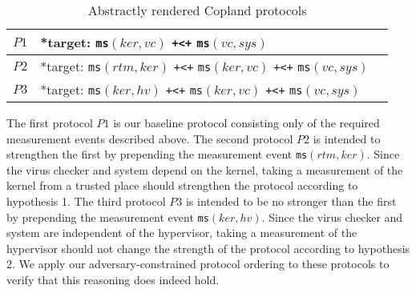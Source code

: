 \documentclass[runningheads]{llncs}
\theoremstyle{definition}
\begin{document}

\begin{table}[h]
  \setlength\extrarowheight{7pt}
  \centering
  \footnotesize
  \begin{tabular}{|M{1cm}|M{8cm}|N}
      \hline  
      $P1$ & *target:  \texttt{ms}$(ker, vc)$ \texttt{+<+} \texttt{ms}$(vc, sys)$ &\\ \hline 
      $P2$ & *target: \texttt{ms}$(rtm, ker)$ \texttt{+<+} \texttt{ms}$(ker, vc)$ \texttt{+<+} \texttt{ms}$(vc, sys)$ &\\
      \hline
      $P3$ & *target: \texttt{ms}$(ker, hv)$ \texttt{+<+} \texttt{ms}$(ker, vc)$ \texttt{+<+} \texttt{ms}$(vc, sys)$ &\\ \hline 
  \end{tabular}
  \caption[Chase Analysis with Varied Dependencies]{Abstractly rendered Copland protocols}
  \label{Chase-table}
\end{table}


The first protocol $P1$ is our baseline protocol consisting only of the required measurement events described above. The second protocol $P2$ is intended to strengthen the first by prepending the measurement event \texttt{ms}$(rtm,ker)$. Since the virus checker and system depend on the kernel, taking a measurement of the kernel from a trusted place should strengthen the protocol according to hypothesis 1. The third protocol $P3$ is intended to be no stronger than the first by prepending the measurement event \texttt{ms}$(ker,hv)$. Since the virus checker and system are independent of the hypervisor, taking a measurement of the hypervisor should not change the strength of the protocol according to hypothesis 2. We apply our adversary-constrained protocol ordering to these protocols to verify that this reasoning does indeed hold.
\end{document}
